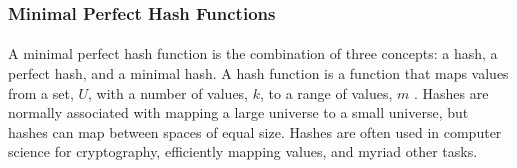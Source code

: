 \begin{comment}
			\paragraph{}The work in a Bloom filter comes from determining the minimum values required for $k$ and $m$ to represent the expected set of values for a required false positive rate. The trade offs are, the larger the number of bits, the lower the probability of a false positive, but the larger the storage of the Bloom filter becomes.  Likewise, an increased number of hash functions provides a lower probability of false positives, but larger numbers of hash functions increases the computational cost of the Bloom filter.  Given a required maximum false positive probability, $p$, and a maximum number of items, $n$, the minimum number of bits, $m$,  is given by:
			\begin{equation}m = \frac{n \ln{p}}{(\ln{2})^2}.\end{equation}
			Once the number of bits, $m$, is determined, the minimum number of hash functions, $k$, must be found.  The required minimum of hash functions is given by:
			\begin{equation} k = \ln{\frac{m}{n}}.\end{equation}
			Bloom filters are flexible and compressible.  They are flexible because the number of bits, $m$, can be changed on the fly based on a changing number of items, $n$.  Various compression techniques can be used to compress the bits, $m$, in the filters for transmission between computers.  The filters can be processed in serial or parallel based on hardware architecture.  Unfortunately, while flexible, Bloom filters are not as compact as their closely related cousin, the minimal perfect hash function.\end{comment}

		\subsubsection{Minimal Perfect Hash Functions}
			\paragraph{} A minimal perfect hash function is the combination of three concepts: a hash, a perfect hash, and a minimal hash. A hash function is a function that maps values from a set, $U$, with a number of values, $k$, to a range of values, $m$ \cite{belazzougui_hash_2009}. Hashes are normally associated with mapping a large universe to a small universe, but hashes can map between spaces of equal size. Hashes are often used in computer science for cryptography, efficiently mapping values, and myriad other tasks. 
